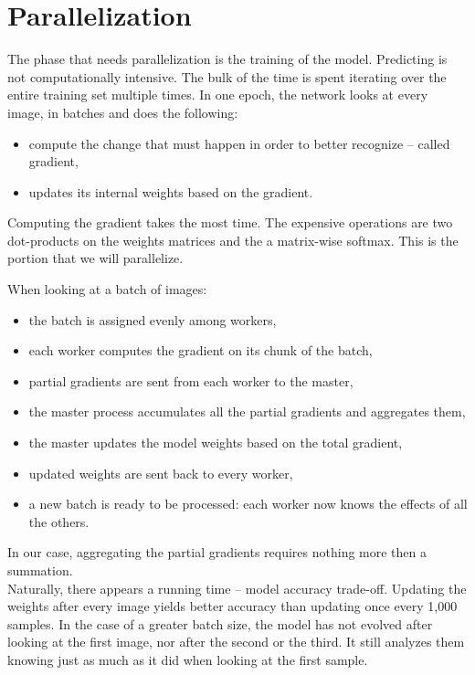 \documentclass[a4paper]{article}
\begin{document}
\newpage
\section{Parallelization}
The phase that needs parallelization is the training of the model. Predicting is not computationally intensive. The bulk of the time is spent iterating over the entire training set multiple times. In one epoch, the network looks at every image, in batches and does the following:
\begin{itemize}
\item compute the change that must happen in order to better recognize -- called gradient,
\item updates its internal weights based on the gradient.
\end{itemize}
Computing the gradient takes the most time. The expensive operations are two dot-products on the weights matrices and the a matrix-wise softmax. This is the portion that we will parallelize.

When looking at a batch of images:
\begin{itemize}
\item the batch is assigned evenly among workers,
\item each worker computes the gradient on its chunk of the batch,
\item partial gradients are sent from each worker to the master,
\item the master process accumulates all the partial gradients and aggregates them,
\item the master updates the model weights based on the total gradient,
\item updated weights are sent back to every worker,
\item a new batch is ready to be processed: each worker now knows the effects of all the others.
\end{itemize}

In our case, aggregating the partial gradients requires nothing more then a summation.
\\

Naturally, there appears a running time -- model accuracy trade-off. Updating the weights after every image yields better accuracy than updating once every 1,000 samples. In the case of a greater batch size, the model has not evolved after looking at the first image, nor after the second or the third. It still analyzes them knowing just as much as it did when looking at the first sample.
\end{document}
